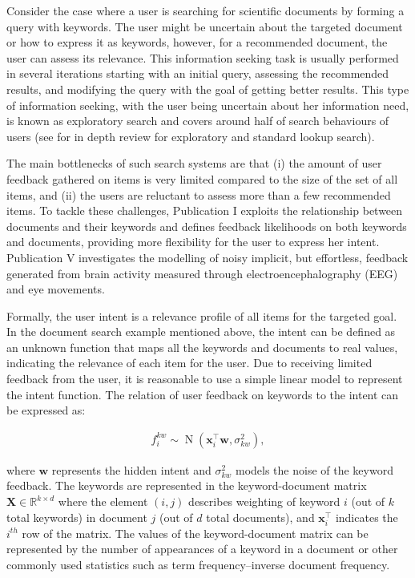 \documentclass[dissertation,math,vertlayout,pdfa,colorlinks]{aaltoseries}
\newcommand{\bw}{\bm{w}}
\DeclareMathOperator{\normalpdf}{N}
\newcommand{\tp}{^{\top}}
\begin{document}
Consider the case where a user is searching for scientific documents by forming a query with keywords. The user might be uncertain about the targeted document or how to express it as keywords, however, for a recommended document, the user can assess its relevance. This information seeking task is usually performed in several iterations starting with an initial query, assessing the recommended results, and modifying the query with the goal of getting better results. This type of information seeking, with the user being uncertain about her information need, is known as exploratory search \cite{Marchionini2006,white2009exploratory} and covers around half of search behaviours of users \cite{Teevan_2004} (see \cite{paba_exploratory_vs_lookup} for in depth review for exploratory and standard lookup search). 

The main bottlenecks of such search systems are that (i) the amount of user feedback gathered on items is very limited compared to the size of the set of all items, and (ii) the users are reluctant to assess more than a few recommended items. To tackle these challenges, Publication I exploits the relationship between documents and their keywords and defines feedback likelihoods on both keywords and documents, providing more flexibility for the user to express her intent. Publication V investigates the modelling of noisy implicit, but effortless, feedback generated from brain activity measured through electroencephalography (EEG) and eye movements.  

Formally, the user intent is a relevance profile of all items for the targeted goal. In the document search example mentioned above, the intent can be defined as an unknown function that maps all the keywords %
and documents to real values, indicating the relevance of each item for the user. Due to receiving limited feedback from the user, it is reasonable to use a simple linear model to represent the intent function. The relation of user feedback on keywords to the intent can be expressed as:

\begin{align}\label{Eq:feedback_on_kw} 
f_{i}^{kw} \sim \normalpdf(\bm{x}_i\tp \bw, \sigma_{kw}^2), 
\end{align}

\noindent where $\bw$ represents the hidden intent and $\sigma_{kw}^2$ models the noise of the keyword feedback. The keywords are represented in the keyword-document matrix $\bm{X} \in \mathbb{R}^{k \times d}$ where the element $(i,j)$ describes weighting of keyword $i$ (out of $k$ total keywords) in document $j$ (out of $d$ total documents), and $\bm{x}_i\tp$ indicates the $i^{th}$ row of the matrix. The values of the keyword-document matrix can be represented by the number of appearances of a keyword in a document or other commonly used statistics such as term frequency–inverse document frequency. 
\end{document}
